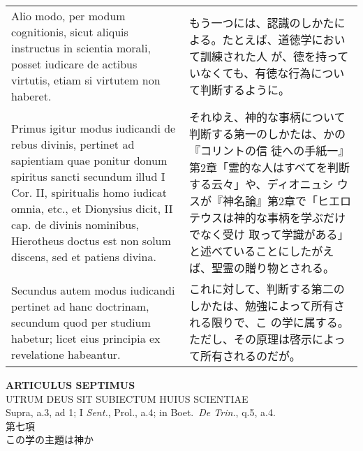 \documentclass[10pt]{jsarticle}
\begin{document}
\begin{longtable}{p{21em}p{21em}}
Alio modo, per modum cognitionis, sicut aliquis instructus in scientia
morali, posset iudicare de actibus virtutis, etiam si virtutem non
haberet.

&

もう一つには、認識のしかたによる。たとえば、道徳学において訓練された人
が、徳を持っていなくても、有徳な行為について判断するように。

\\

Primus igitur modus iudicandi de rebus divinis, pertinet ad sapientiam
quae ponitur donum spiritus sancti secundum illud I Cor. II,
spiritualis homo iudicat omnia, etc., et Dionysius dicit, II cap. de
divinis nominibus, Hierotheus doctus est non solum discens, sed et
patiens divina.

&

それゆえ、神的な事柄について判断する第一のしかたは、かの『コリントの信
徒への手紙一』第2章「霊的な人はすべてを判断する云々」や、ディオニュシ
ウスが『神名論』第2章で「ヒエロテウスは神的な事柄を学ぶだけでなく受け
取って学識がある」 と述べていることにしたがえば、聖霊の贈り物とされる。


\\

Secundus autem modus iudicandi pertinet ad hanc doctrinam, secundum
quod per studium habetur; licet eius principia ex revelatione
habeantur.


&

これに対して、判断する第二のしかたは、勉強によって所有される限りで、こ
の学に属する。ただし、その原理は啓示によって所有されるのだが。


\end{longtable}
\newpage

\begin{center}
 {\Large {\bf ARTICULUS SEPTIMUS}}\\
 {\large UTRUM DEUS SIT SUBIECTUM HUIUS SCIENTIAE}\\
 {\footnotesize Supra, a.3, ad 1; I {\itshape Sent.}, Prol., a.4; in
 Boet.~{\itshape De Trin.}, q.5, a.4.}\\
 {\Large 第七項\\この学の主題は神か}
\end{center}
\end{document}
